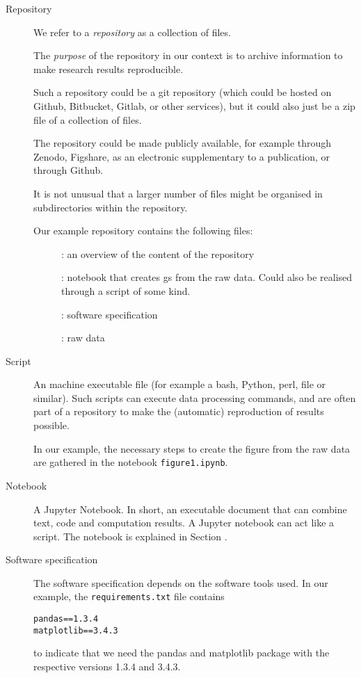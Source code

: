 \begin{description}
\item[Repository] We refer to a \emph{repository} as a collection of files.

The \emph{purpose} of the repository in our context is to archive information to make
research results reproducible.

Such a repository could be a git repository (which could be hosted on Github,
Bitbucket, Gitlab, or other services), but it could also just be a zip file of a
collection of files.

The repository could be made publicly available, for example through Zenodo,
Figshare, as an electronic supplementary to a publication, or through Github.

It is not unusual that a larger number of files might be
organised in subdirectories within the repository.

Our example repository \cite{ReproducibilityRepositoryExample2022} contains the following files:

\begin{description}
\item[]: an overview of the content of the repository
\item[]: notebook that creates gs from
  the raw data. Could also be realised through a script of some kind.
\item[]: software specification
\item[]: raw data
\end{description}

\item[Script] An machine executable file (for example a bash, Python, perl, file
or similar). Such scripts can execute data processing commands, and are often
part of a repository to make the (automatic) reproduction of results possible.

In our example, the necessary steps to create the figure from the raw data are
gathered in the notebook \texttt{figure1.ipynb}.

\item[Notebook] A Jupyter Notebook. In short, an executable document that can
  combine text, code and computation results. A Jupyter notebook can act like a
  script. The notebook is explained in Section .

\item[Software specification] The software specification depends on the software
  tools used. In our example, the \texttt{requirements.txt} file contains
\begin{verbatim}
pandas==1.3.4
matplotlib==3.4.3
\end{verbatim}
to indicate that we need the pandas and matplotlib package with the respective
versions 1.3.4 and 3.4.3.


\end{description}
